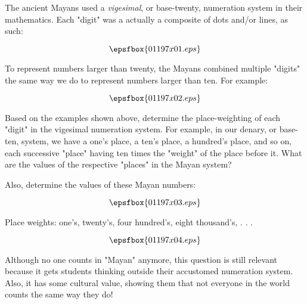 

The ancient Mayans used a {\it vigesimal}, or base-twenty, numeration system in their mathematics.  Each "digit" was a actually a composite of dots and/or lines, as such:

$$\epsfbox{01197x01.eps}$$

To represent numbers larger than twenty, the Mayans combined multiple "digits" the same way we do to represent numbers larger than ten.  For example:

$$\epsfbox{01197x02.eps}$$

Based on the examples shown above, determine the place-weighting of each "digit" in the vigesimal numeration system.  For example, in our denary, or base-ten, system, we have a one's place, a ten's place, a hundred's place, and so on, each successive "place" having ten times the "weight" of the place before it.  What are the values of the respective "places" in the Mayan system?

Also, determine the values of these Mayan numbers:

$$\epsfbox{01197x03.eps}$$







Place weights: one's, twenty's, four hundred's, eight thousand's, . . .

\vskip 10pt

$$\epsfbox{01197x04.eps}$$







Although no one counts in "Mayan" anymore, this question is still relevant because it gets students thinking outside their accustomed numeration system.  Also, it has some cultural value, showing them that not everyone in the world counts the same way they do!




